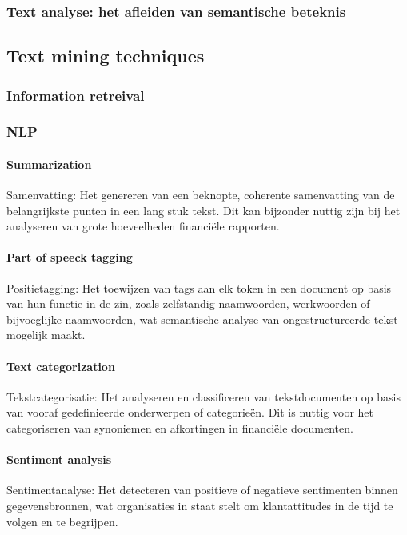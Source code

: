 \subsubsection{Text analyse: het afleiden van semantische beteknis}


















\subsection{Text mining techniques}
\subsubsection{Information retreival}
\subsubsection{NLP}
\paragraph{Summarization}
Samenvatting: Het genereren van een beknopte, coherente samenvatting van de belangrijkste punten in een lang stuk tekst. Dit kan bijzonder nuttig zijn bij het analyseren van grote hoeveelheden financiële rapporten.

\paragraph{Part of speeck tagging}
Positietagging: Het toewijzen van tags aan elk token in een document op basis van hun functie in de zin, zoals zelfstandig naamwoorden, werkwoorden of bijvoeglijke naamwoorden, wat semantische analyse van ongestructureerde tekst mogelijk maakt.

\paragraph{Text categorization}
Tekstcategorisatie: Het analyseren en classificeren van tekstdocumenten op basis van vooraf gedefinieerde onderwerpen of categorieën. Dit is nuttig voor het categoriseren van synoniemen en afkortingen in financiële documenten.

\paragraph{Sentiment analysis}
Sentimentanalyse: Het detecteren van positieve of negatieve sentimenten binnen gegevensbronnen, wat organisaties in staat stelt om klantattitudes in de tijd te volgen en te begrijpen.


